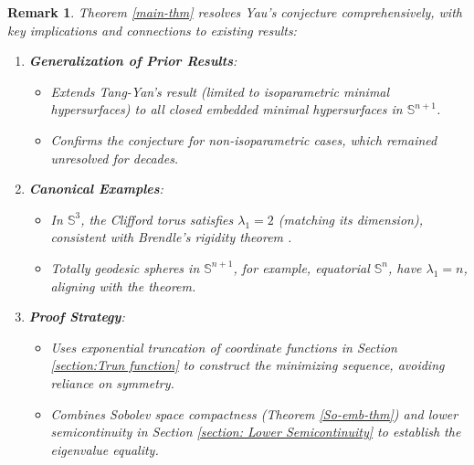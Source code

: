 \documentclass[a4, 12pt]{amsart}
\numberwithin{equation}{section} \numberwithin{equation}{section}
\newtheorem{rem}{Remark}[section]{\bfseries\upshape}
\begin{document}
\begin{rem}
Theorem \ref{main-thm} resolves Yau's conjecture comprehensively, with key implications and connections to existing results:

\begin{enumerate}
    \item \textbf{Generalization of Prior Results}:
    \begin{itemize}
        \item[(i)] Extends Tang-Yan's result \cite{TY1} (limited to isoparametric minimal hypersurfaces) to all closed embedded minimal hypersurfaces in $\mathbb{S}^{n+1}$.
       \item[(ii)] Confirms the conjecture for non-isoparametric cases, which remained unresolved for decades.
    \end{itemize}

    \item \textbf{Canonical Examples}:
    \begin{itemize}
    \item[(i)] In $\mathbb{S}^3$, the Clifford torus satisfies $\lambda_1 = 2$ (matching its dimension), consistent with Brendle's rigidity theorem \cite{Br1}.
        \item[(ii)]  Totally geodesic spheres in $\mathbb{S}^{n+1}$, for example, equatorial $\mathbb{S}^n$, have $\lambda_1 = n$, aligning with the theorem.
    \end{itemize}

    \item \textbf{Proof Strategy}:
    \begin{itemize}
       \item[(i)]  Uses exponential truncation of coordinate functions in Section \ref{section:Trun function} to construct the minimizing sequence, avoiding reliance on symmetry.
        \item[(ii)]  Combines Sobolev space compactness (Theorem \ref{So-emb-thm}) and lower semicontinuity in Section \ref{section: Lower Semicontinuity} to establish the eigenvalue equality.
    \end{itemize}
\end{enumerate}
\end{rem}
\end{document}
